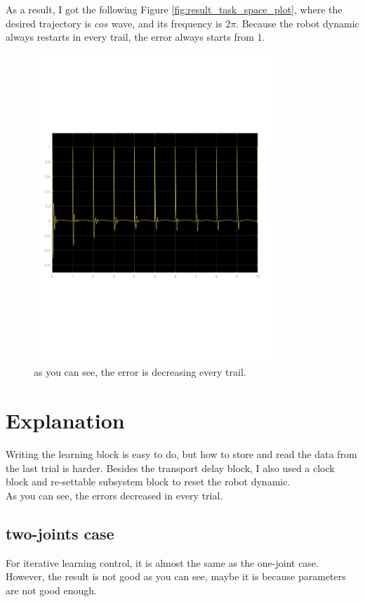 \documentclass{article}
\begin{document}
As a result, I got the following Figure \ref{fig:result_task_space_plot}, where the desired trajectory is $cos$ wave, and its frequency is $2 \pi$. Because the robot dynamic always restarts in every trail, the error always starts from $1$.
\\
\begin{figure}[ht]
    \centering
    \includegraphics[width=0.8\textwidth]{figures/result_ilc.pdf}
    \caption{as you can see, the error is decreasing every trail.}
    \label{fig:result_ilc}
\end{figure}





\newpage

\section{Explanation}



Writing the learning block is easy to do, but how to store and read the data from the last trial is harder. Besides the transport delay block, I also used a clock block and re-settable subsystem block to reset the robot dynamic.\\

As you can see, the errors decreased in every trial.
\subsection{two-joints case}
For iterative learning control, it is almost the same as the one-joint case.\\

However, the result is not good as you can see, maybe it is because parameters are not good enough.\\
\end{document}
